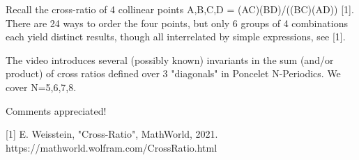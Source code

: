 Recall the cross-ratio of 4 collinear points A,B,C,D  = (AC)(BD)/((BC)(AD)) [1]. There are 24 ways to order the four points, but only 6 groups of 4 combinations each yield distinct results, though all interrelated by simple expressions, see [1].

The video introduces several (possibly known) invariants in the sum (and/or product) of cross ratios defined over 3 "diagonals" in Poncelet N-Periodics. We cover N=5,6,7,8.

Comments appreciated!

[1] E. Weisstein, "Cross-Ratio", MathWorld, 2021. https://mathworld.wolfram.com/CrossRatio.html